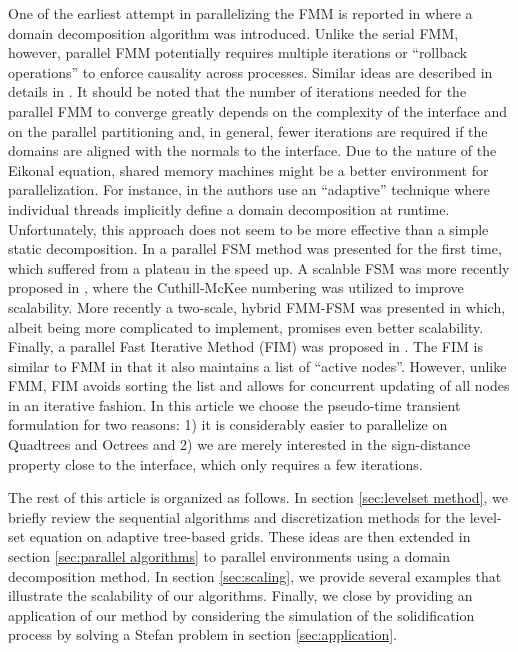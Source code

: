 One of the earliest attempt in parallelizing the FMM is reported in \cite{Herrmann:03:A-domain-decompositi} where a domain decomposition algorithm was introduced. Unlike the serial FMM, however, parallel FMM potentially requires multiple iterations or ``rollback operations'' to enforce causality across processes. Similar ideas are described in details in \cite{Tugurlan:08:Fast-marching-method}. It should be noted that the number of iterations needed for the parallel FMM to converge greatly depends on the complexity of the interface and on the parallel partitioning and, in general, fewer iterations are required if the domains are aligned with the normals to the interface. Due to the nature of the Eikonal equation, shared memory machines might be a better environment for parallelization. For instance, in \cite{Breus;Cristiani;Gwosdek;etal:11:An-adaptive-domain-d} the authors use an ``adaptive'' technique where individual threads implicitly define a domain decomposition at runtime. Unfortunately, this approach does not seem to be more effective than a simple static decomposition. In \cite{Zhao:07:Parallel-implementat} a parallel FSM method was presented for the first time, which suffered from a plateau in the speed up. A scalable FSM was more recently proposed in \cite{Detrixhe;Gibou;Min:13:A-parallel-fast-swee}, where the Cuthill-McKee numbering was utilized to improve scalability. More recently a two-scale, hybrid FMM-FSM was presented in \cite{Chacon;Vladimirsky:13:A-parallel-Heap-Cell} which, albeit being more complicated to implement, promises even better scalability. Finally, a parallel Fast Iterative Method (FIM) was proposed in \cite{Jeong;Whitaker:08:A-fast-iterative-met}. The FIM is similar to FMM in that it also maintains a list of ``active nodes''. However, unlike FMM, FIM avoids sorting the list and allows for concurrent updating of all nodes in an iterative fashion. In this article we choose the pseudo-time transient formulation for two reasons: 1) it is considerably easier to parallelize on Quadtrees and Octrees and 2) we are merely interested in the sign-distance property close to the interface, which only requires a few iterations.

The rest of this article is organized as follows. In section \ref{sec:levelset method}, we briefly review the sequential algorithms and discretization methods for the level-set equation on adaptive tree-based grids. These ideas are then extended in section \ref{sec:parallel algorithms} to parallel environments using a domain decomposition method. In section \ref{sec:scaling}, we provide several examples that illustrate the scalability of our algorithms. Finally, we close by providing an application of our method by considering the simulation of the solidification process by solving a Stefan problem in section \ref{sec:application}.
